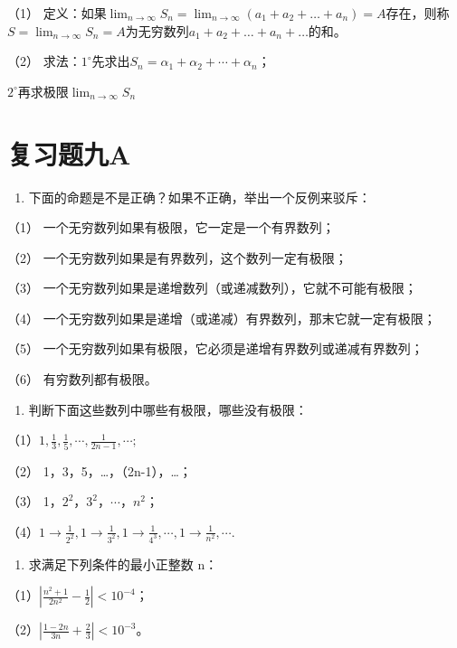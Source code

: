 （1）
定义：如果\(\lim_{n\to \infty}S_n = \lim_{n\to \infty}(a_1 + a_2 + \dots +a_n) = A\)存在，则称\(S = \lim_{n\to \infty}S_n = A\)为无穷数列\(a_1 + a_2 + \dots +a_n + \dots\)的和。

（2）
求法：\(1^{\circ}\)先求出\(S_{n}=\alpha_{1}+\alpha_{2}+\cdots+\alpha_{n}\)；

\(2^{\circ}\)再求极限\(\lim_{n\to \infty}S_{n}\)

\section{复习题九A}

\begin{enumerate}
\item
  下面的命题是不是正确？如果不正确，举出一个反例来驳斥：
\end{enumerate}

（1） 一个无穷数列如果有极限，它一定是一个有界数列；

（2） 一个无穷数列如果是有界数列，这个数列一定有极限；

（3） 一个无穷数列如果是递增数列（或递减数列），它就不可能有极限；

（4） 一个无穷数列如果是递增（或递减）有界数列，那末它就一定有极限；

（5） 一个无穷数列如果有极限，它必须是递增有界数列或递减有界数列；

（6） 有穷数列都有极限。

\begin{enumerate}[start=2]
\item
  判断下面这些数列中哪些有极限，哪些没有极限：
\end{enumerate}

（1）\(1, \frac{1}{3}, \frac{1}{5}, \cdots, \frac{1}{2n-1}, \cdots;\)

（2） 1，3，5，\ldots，（2n-1），\ldots；

（3） 1，\(2^{2}\)，\(3^{2}\)，\(\cdots\)，\(n^{2}\)；

（4）\(1 \rightarrow \frac{1}{2^2}, 1 \rightarrow \frac{1}{3^2}, 1 \rightarrow \frac{1}{4^3}, \cdots, 1 \rightarrow \frac{1}{n^2}, \cdots.\)

\begin{enumerate}[start=3]
\item
  求满足下列条件的最小正整数 n：
\end{enumerate}

（1）\(\left|\frac{n^2 + 1}{2n^2} - \frac{1}{2}\right| < 10^{-4}\)；

（2）\(\left|\frac{1 - 2n}{3n} + \frac{2}{3}\right| < 10^{-3}\)。

